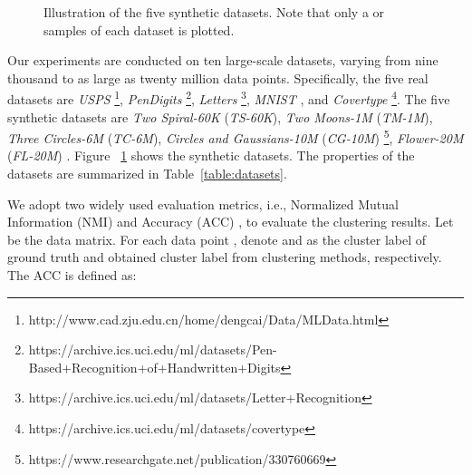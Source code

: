 \begin{figure}\begin{center}
    {}
    {}
    {}
    {}
    {}
    \caption{Illustration of the five synthetic datasets. Note that only a  or  samples of each dataset is plotted.}
    \label{fig:fiveSynDS}
  \end{center}
\end{figure}

Our experiments are conducted on ten large-scale datasets, varying from nine thousand to as large as twenty million data points. Specifically, the five real datasets are \emph{USPS} \cite{cai2010graph} \footnote{\label{cai_deng_data} http://www.cad.zju.edu.cn/home/dengcai/Data/MLData.html}, \emph{PenDigits} \cite{asuncion2007uci} \footnote{https://archive.ics.uci.edu/ml/datasets/Pen-Based+Recognition+of+Handwritten+Digits}, \emph{Letters} \cite{frey1991letter} \footnote{https://archive.ics.uci.edu/ml/datasets/Letter+Recognition}, \emph{MNIST} \cite{cai2011speed} , and \emph{Covertype} \cite{blackard1999comparative} \footnote{https://archive.ics.uci.edu/ml/datasets/covertype}. The five synthetic datasets are \emph{Two Spiral-60K} (\emph{TS-60K}), \emph{Two
  Moons-1M} (\emph{TM-1M}), \emph{Three Circles-6M} (\emph{TC-6M}), \emph{Circles and Gaussians-10M} (\emph{CG-10M}) \cite{huang2019ultra} \footnote{\label{huang}https://www.researchgate.net/publication/330760669}, \emph{Flower-20M} (\emph{FL-20M}) \cite{huang2019ultra} . Figure ~\ref{fig:fiveSynDS} shows the synthetic datasets.
The properties of the datasets are summarized in Table~\ref{table:datasets}.

We adopt two widely used evaluation metrics, i.e., Normalized Mutual Information (NMI) \cite{slonim2000agglomerative} and Accuracy (ACC) \cite{yan2009fast}, to evaluate the clustering results.
Let  be the data matrix. For each data point , denote  and  as the cluster label of ground truth and obtained cluster label from clustering methods, respectively. The ACC is defined as:

